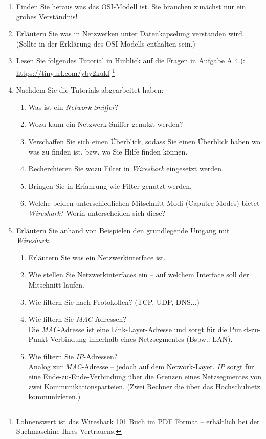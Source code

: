 \documentclass[paper=a4,fontsize=11pt]{scrartcl}%
\numberwithin{equation}{section}
\begin{document}
\begin{enumerate}
	\item Finden Sie heraus was das OSI-Modell ist. Sie brauchen zunächst nur ein grobes Verständnis!
	\item Erläutern Sie was in Netzwerken unter Datenkapselung verstanden wird. (Sollte in der Erklärung des OSI-Modells enthalten sein.)	
	\item Lesen Sie folgendes Tutorial in Hinblick auf die Fragen in Aufgabe A 4.): \url{https://tinyurl.com/yby2kukf}
	\footnote{Lohnenswert ist das Wireshark 101 Buch im PDF Format -- erhältlich bei der Suchmaschine Ihres Vertrauens.}
	\item Nachdem Sie die Tutorials abgearbeitet haben:
	\begin{enumerate}
		\item Was ist ein \emph{Network-Sniffer}?
		\item Wozu kann ein Netzwerk-Sniffer genutzt werden?
		\item Verschaffen Sie sich einen Überblick, sodass Sie einen Überblick haben wo was zu finden ist, bzw. wo Sie Hilfe finden können.
		\item Recherchieren Sie wozu Filter in \emph{Wireshark} eingesetzt werden.
		\item Bringen Sie in Erfahrung wie Filter genutzt werden.
		\item Welche beiden unterschiedlichen Mitschnitt-Modi (Caputre Modes) bietet \emph{Wireshark}? Worin unterscheiden sich diese?
	\end{enumerate}
	\item Erläutern Sie anhand von Beispielen den grundlegende Umgang mit \emph{Wireshark}. 
	\begin{enumerate}
		\item Erläutern Sie was ein Netzwerkinterface ist.
		\item Wie stellen Sie Netzwerkinterfaces ein -- auf welchem Interface soll der Mitschnitt laufen.
		\item Wie filtern Sie nach Protokollen? (TCP, UDP, DNS...)
		\item Wie filtern Sie \emph{MAC}-Adressen?\\Die \emph{MAC}-Adresse ist eine Link-Layer-Adresse und sorgt für die Punkt-zu-Punkt-Verbindung innerhalb eines Netzsegmentes (Bspw.: LAN).
		\item Wie filtern Sie \emph{IP}-Adressen?\\Analog zur \emph{MAC}-Adresse -- jedoch auf dem Network-Layer. \emph{IP} sorgt für eine Ende-zu-Ende-Verbindung über die Grenzen eines Netzsegmentes von zwei Kommunikationsparteien. (Zwei Rechner die über das Hochschulnetz kommunizieren.) 

\end{enumerate}
\end{enumerate}
\end{document}
